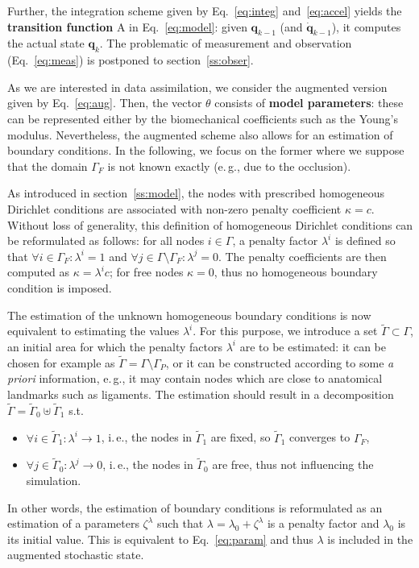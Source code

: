 \documentclass[paper=a4, fontsize=11pt]{article}
\def\eg{e.\,g.}
\def\ie{i.\,e.}
\def\pos{\mathbf{q}}
\def\vel{\mathbf{\dot{q}}}
\def\initg{\tilde\Gamma}
\begin{document}
Further, the integration scheme given by Eq.~\ref{eq:integ} and~\ref{eq:accel} yields the 
{\bf transition function} A in Eq.~\ref{eq:model}: given $\pos_{k-1}$ (and $\vel_{k-1}$),
it computes the actual state $\pos_k$. The problematic of measurement and observation (Eq.~\ref{eq:meas}) is postponed to section~\ref{ss:obser}. 

As we are interested in data assimilation, we consider the 
augmented version given by Eq.~\ref{eq:aug}. Then, the vector $\theta$ consists of {\bf model parameters}: 
these can be represented either by the biomechanical coefficients such as the 
Young's modulus. Nevertheless, the augmented scheme also allows for an estimation of boundary conditions.
In the following, we focus on the former where we suppose that the domain $\Gamma_F$ is not 
known exactly (\eg, due to the occlusion). 

As introduced in section~\ref{ss:model}, the nodes with prescribed homogeneous Dirichlet conditions 
are associated with non-zero penalty coefficient $\kappa=c$. 
Without loss of generality, this definition of homogeneous Dirichlet conditions can be reformulated 
as follows: for all nodes $i\in\Gamma$, a penalty factor $\lambda^i$ is defined so that 
$\forall i\in\Gamma_F: \lambda^i = 1$ and $\forall j\in\Gamma\setminus\Gamma_F: \lambda^j = 0$.
The penalty coefficients are then computed as $\kappa=\lambda^ic$; for free nodes $\kappa = 0$, thus 
no homogeneous boundary condition is imposed.

The estimation of the unknown homogeneous boundary conditions is now equivalent to estimating the values $\lambda^i$. 
For this purpose, we introduce a set $\initg\subset\Gamma$, an initial area 
for which the penalty factors $\lambda^i$ are to be estimated: it can be chosen for example as $\initg=\Gamma\setminus \Gamma_P$, 
or it can be constructed according to some \emph{a priori} information, \eg, it may contain nodes which 
are close to anatomical landmarks such as ligaments. The estimation should result in a decomposition
$\initg = \tilde\Gamma_0\uplus\tilde\Gamma_1$ s.t.
\begin{itemize} 
	\item $\forall i\in\tilde\Gamma_1: \lambda^i\rightarrow 1$, \ie, the nodes in $\tilde\Gamma_1$ are fixed, so 
	$\tilde\Gamma_1$ converges to $\Gamma_F$,
	\item $\forall j\in\tilde\Gamma_0: \lambda^j\rightarrow 0$, \ie, the nodes in $\tilde\Gamma_0$ are free, thus
	not influencing the simulation.  
\end{itemize}
In other words, the estimation of boundary conditions is reformulated as an estimation of a parameters
$\zeta^\lambda$ such that $\lambda = \lambda_0 + \zeta^\lambda$ is a penalty factor and $\lambda_0$ is  
its initial value. This is equivalent to Eq.~\ref{eq:param} and thus $\lambda$ is included in the augmented 
stochastic state. 
\end{document}
